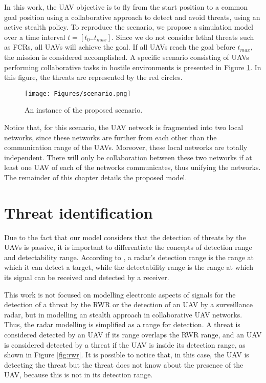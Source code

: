 In this work, the UAV objective is to fly from the start position to a common goal position using a collaborative approach to detect and avoid threats, using an active stealth policy. To reproduce the scenario, we propose a simulation model over a time interval $t=[t_0..t_{max}]$. Since we do not consider lethal threats such as FCRs, all UAVs will achieve the goal. If all UAVs reach the goal before $t_{max}$, the mission is considered accomplished. A specific scenario consisting of UAVs performing collaborative tasks in hostile environments is presented in Figure \ref{fig:scenario}. In this figure, the threats are represented by the red circles.

\begin{figure}[h!]
    \centering
    \texttt{[image: Figures/scenario.png]}
    \caption{An instance of the proposed scenario.}
    \label{fig:scenario}
\end{figure}

Notice that, for this scenario, the UAV network is fragmented into two local networks, since these networks are further from each other than the communication range of the UAVs. Moreover, these local networks are totally independent. There will only be collaboration between these two networks if at least one UAV of each of the networks communicates, thus unifying the networks. The remainder of this chapter details the proposed model. 

\section{Threat identification}

Due to the fact that our model considers that the detection of threats by the UAVs is passive, it is important to differentiate the concepts of detection range and detectability range. According to \cite{adamy2004}, a radar's detection range is the range at which it can detect a target, while the detectability range is the range at which its signal can be received and detected by a receiver.
 
This work is not focused on modelling electronic aspects of signals for the detection of a threat by the RWR or the detection of an UAV by a surveillance radar, but in modelling an stealth approach in collaborative UAV networks. Thus, the radar modelling is simplified as a range for detection. A threat is considered detected by an UAV if its range overlaps the RWR range, and an UAV is considered detected by a threat if the UAV is inside its detection range, as shown in Figure \ref{fig:rwr}. It is possible to notice that, in this case, the UAV is detecting the threat but the threat does not know about the presence of the UAV, because this is not in its detection range. 

